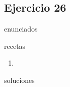 \subsection{Ejercicio 26}
\def\parte{enunciados}
\ifx\capitulo\parte

\fi

\def\parte{recetas}
\ifx\capitulo\parte
\begin{enumerate}
\item
\end{enumerate}
\fi

\def\parte{soluciones}
\ifx\capitulo\parte
%
\fi

